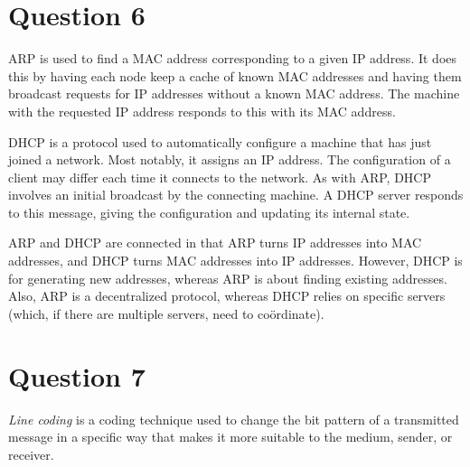 \documentclass{article}
\begin{document}
\section*{Question 6}
ARP is used to find a MAC address corresponding to a given IP address. It does this by having each node keep a cache of known MAC addresses and having them broadcast requests for IP addresses without a known MAC address. The machine with the requested IP address responds to this with its MAC address.

DHCP is a protocol used to automatically configure a machine that has just joined a network. Most notably, it assigns an IP address. The configuration of a client may differ each time it connects to the network. As with ARP, DHCP involves an initial broadcast by the connecting machine. A DHCP server responds to this message, giving the configuration and updating its internal state.

ARP and DHCP are connected in that ARP turns IP addresses into MAC addresses, and DHCP turns MAC addresses into IP addresses. However, DHCP is for generating new addresses, whereas ARP is about finding existing addresses. Also, ARP is a decentralized protocol, whereas DHCP relies on specific servers (which, if there are multiple servers, need to co\"ordinate).

\section*{Question 7}
\textit{Line coding} is a coding technique used to change the bit pattern of a transmitted message in a specific way that makes it more suitable to the medium, sender, or receiver.
\end{document}
